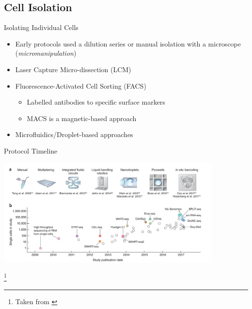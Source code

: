 \documentclass[aspectratio=169,11pt]{beamer}
\newcommand\blfootnote[1]{%
  \begingroup
  \renewcommand\thefootnote{}\footnote{#1}%
  \addtocounter{footnote}{-1}%
  \endgroup
}
\begin{document}
\subsection{Cell Isolation}

\begin{frame}{Isolating Individual Cells}

	\begin{itemize}
		\item Early protocols used a dilution series or manual isolation with a microscope (\textit{micromanipulation})
		\item Laser Capture Micro-dissection (LCM)
		\item Fluorescence-Activated Cell Sorting (FACS)
		\begin{itemize}
			\item Labelled antibodies to specific surface markers 
			\item MACS is a magnetic-based approach
		\end{itemize}
		\item Microfluidics/Droplet-based approaches
	\end{itemize}

\end{frame}

\begin{frame}{Protocol Timeline}

	\begin{center}
		\includegraphics[width=0.85\textwidth]{figures/scRNATimeline.jpg} 
	\end{center}

	\blfootnote{Taken from \cite{pmid29494575}}

\end{frame}
\end{document}
